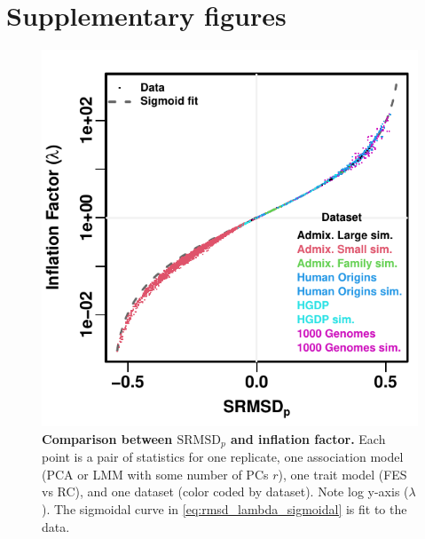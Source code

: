 \documentclass[11pt]{article}
\newcommand{\rmsd}{\text{SRMSD}_p}
\newcommand{\beginsupplement}{%
  \setcounter{table}{0}
  \renewcommand{\thetable}{S\arabic{table}}%
  \setcounter{figure}{0}
  \renewcommand{\thefigure}{S\arabic{figure}}%
  \setcounter{section}{0}
  \renewcommand{\thesection}{S\arabic{section}}%
  \setcounter{equation}{0}
  \renewcommand{\theequation}{S\arabic{equation}}%
  \setcounter{page}{1}
  \renewcommand{\thepage}{S\arabic{page}}%
}
\begin{document}
\printbibliography


\clearpage

\beginsupplement

\section{Supplementary figures}

\begin{figure}[hp!]
  \centering
  \includegraphics{sum-rmsd-vs-lambda.pdf}
  \caption{
    {\bf Comparison between $\rmsd$ and inflation factor.}
    Each point is a pair of statistics for one replicate, one association model (PCA or LMM with some number of PCs $r$), one trait model (FES vs RC), and one dataset (color coded by dataset).
    Note log y-axis ($\lambda$).
    The sigmoidal curve in \cref{eq:rmsd_lambda_sigmoidal} is fit to the data.
  }
  \label{fig:rmsd_lambda}
\end{figure}
\end{document}

